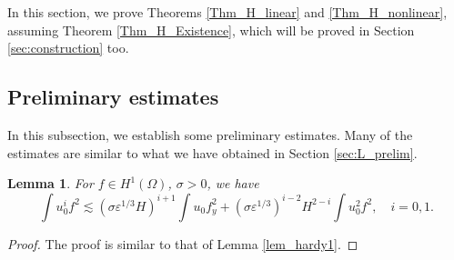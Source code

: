 \documentclass[reqno, 11pt]{amsart}
\theoremstyle{plain}
\newtheorem{lemma}[theorem]{Lemma}
\theoremstyle{definition}
\theoremstyle{remark}
\numberwithin{equation}{section}
\begin{document}
In this section, we prove Theorems \ref{Thm_H_linear} and \ref{Thm_H_nonlinear}, assuming Theorem \ref{Thm_H_Existence}, which will be proved in Section \ref{sec:construction} too.

\subsection{Preliminary estimates} In this subsection, we establish some preliminary estimates. Many of the estimates are similar to what we have obtained in Section \ref{sec:L_prelim}.

\begin{lemma}\label{lem_hardy1_narrow}
For $f \in H^1(\Omega)$, $\sigma > 0$, we have
\begin{equation}\label{Hardy1_narrow}
\int u_0^i f^2 \lesssim (\sigma \varepsilon^{1/3}H)^{i+1}  \int u_0 f_{y}^2 + (\sigma \varepsilon^{1/3})^{i-2}H^{2-i}  \int u_0^2 f^2, \quad i=0,1.
\end{equation}
\end{lemma}
\begin{proof}
The proof is similar to that of Lemma \ref{lem_hardy1}.
\end{proof}
\end{document}
